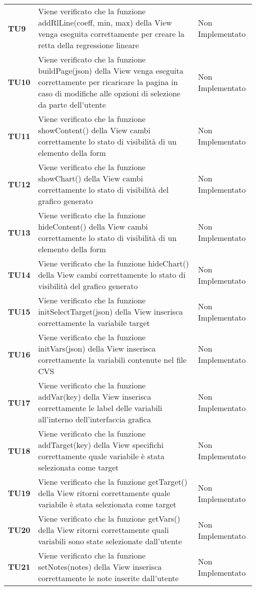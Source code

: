 \documentclass[../piano-di-qualifica.tex]{subfiles}
\begin{document}
\begin{longtable}[H]{>{\centering\bfseries}m{2.5cm} >{\centering}m{7.5cm} >{\centering\arraybackslash}m{3.5cm}}
  \textbf{TU9} & Viene verificato che la funzione addRlLine(coeff, min, max) della View venga eseguita correttamente per creare la retta della regressione lineare & Non Implementato \\
  \textbf{TU10} & Viene verificato che la funzione buildPage(json) della View venga eseguita correttamente per ricaricare la pagina in caso di modifiche alle opzioni di selezione da parte dell'utente & Non Implementato \\
  \textbf{TU11} & Viene verificato che la funzione showContent() della View cambi correttamente lo stato di visibilità di un elemento della form & Non Implementato \\
  \textbf{TU12} & Viene verificato che la funzione showChart() della View cambi correttamente lo stato di visibilità del grafico generato & Non Implementato \\
  \textbf{TU13} & Viene verificato che la funzione hideContent() della View cambi correttamente lo stato di visibilità di un elemento della form & Non Implementato \\
  \textbf{TU14} & Viene verificato che la funzione hideChart() della View cambi correttamente lo stato di visibilità del grafico generato & Non Implementato \\
  \textbf{TU15} & Viene verificato che la funzione initSelectTarget(json) della View inserisca correttamente la variabile target & Non Implementato \\
  \textbf{TU16} & Viene verificato che la funzione initVars(json) della View inserisca correttamente la variabili contenute nel file CVS & Non Implementato \\
  \textbf{TU17} & Viene verificato che la funzione addVar(key) della View inserisca correttamente le label delle variabili all'interno dell'interfaccia grafica & Non Implementato \\
  \textbf{TU18} & Viene verificato che la funzione addTarget(key) della View specifichi correttamente quale variabile è stata selezionata come target & Non Implementato \\
  \textbf{TU19} & Viene verificato che la funzione getTarget() della View ritorni correttamente quale variabile è stata selezionata come target & Non Implementato \\
  \textbf{TU20} & Viene verificato che la funzione getVars() della View ritorni correttamente quali variabili sono state selezionate dall'utente & Non Implementato \\
  \textbf{TU21} & Viene verificato che la funzione setNotes(notes) della View inserisca correttamente le note inserite dall'utente & Non Implementato \\

\end{longtable}
\end{document}

